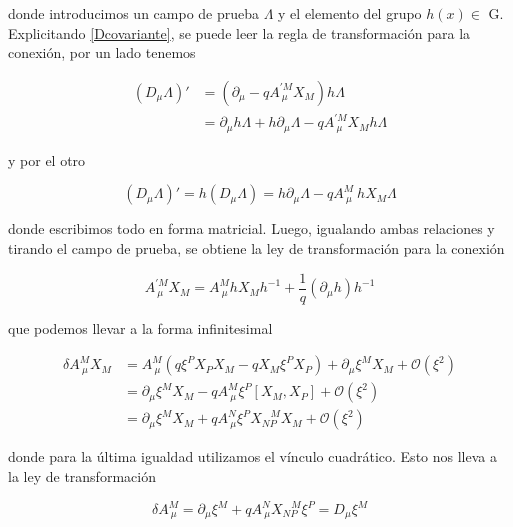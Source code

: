 \documentclass{article}
\numberwithin{equation}{section}
\begin{document}
donde introducimos un campo de prueba $ \Lambda $ y el elemento del grupo $ h(x) \in $ G. Explicitando \ref{Dcovariante}, se puede leer la regla de transformación para 
la conexión, por un lado tenemos

\begin{equation}
\begin{aligned}
\left(D_{\mu} \Lambda\right)' &= \left( \partial_{\mu} - q A^{'M}_{\ \mu} X_M\right) h \Lambda\\
&= \partial_{\mu} h \Lambda + h \partial_{\mu} \Lambda - q A^{'M}_{\ \mu} X_M h \Lambda
\end{aligned}
\end{equation}

y por el otro

\begin{equation}
\left(D_{\mu} \Lambda\right)' = h \left(D_{\mu} \Lambda\right) = h\partial_{\mu}\Lambda - q A^M_{\ \mu} \ h X_M \Lambda
\end{equation}

donde escribimos todo en forma matricial. Luego, igualando ambas relaciones y tirando el campo de prueba, se obtiene la ley de transformación para la conexión

\begin{equation}
A^{'M}_{\ \mu} X_M = A^M_{\ \mu} h X_M h^{-1} + \frac{1}{q} \left( \partial_{\mu} h\right)h^{-1}
\end{equation}

que podemos llevar a la forma infinitesimal

\begin{equation}
\begin{aligned}
\delta A^M_{\ \mu} X_M &= A^M_{\ \mu} \left( q \xi^P X_P X_M -q X_M \xi^P X_P \right)  + \partial_{\mu} \xi^M X_M + \mathcal{O}(\xi^2)\\
&= \partial_{\mu} \xi^M X_M - q A^M_{\ \mu} \xi^P \left[X_M, X_P\right] + \mathcal{O}(\xi^2)\\
&= \partial_{\mu} \xi^M X_M + q A^N_{\ \mu} \xi^P X_{N P}^{\ \ \ \ M} X_M + \mathcal{O}(\xi^2)
\end{aligned}
\end{equation}

donde para la última igualdad utilizamos el vínculo cuadrático. Esto nos lleva a la ley de transformación

\begin{boxquation}
	\begin{equation}\label{deltaA}
	\delta A^M_{\ \mu} = \partial_{\mu} \xi^M + q A^N_{\ \mu} X_{N P}^{\ \ \ \ M} \xi^P = D_{\mu} \xi^M 
	\end{equation}
\end{boxquation}
\end{document}
